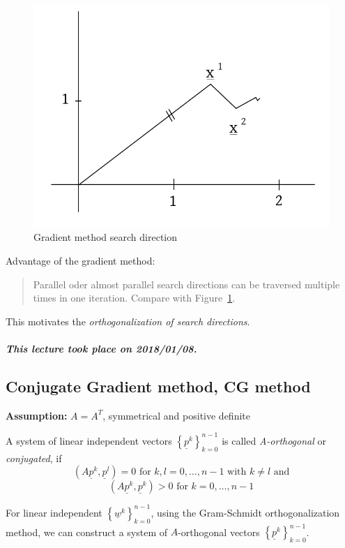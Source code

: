 \documentclass{article}
\newcommand{\dateref}[1]{\paragraph{\textit{This lecture took place on #1.}}}
\begin{document}
\begin{figure}[t]
  \begin{center}
    \includegraphics{img/gradient_method_search_direction.pdf}
    \caption{Gradient method search direction}
    \label{img:searchdir}
  \end{center}
\end{figure}
Advantage of the gradient method:
\begin{quote}
  Parallel oder almost parallel search directions can be traversed multiple times in one iteration.
  Compare with Figure~\ref{img:searchdir}.
\end{quote}
This motivates the \emph{orthogonalization of search directions}.

\dateref{2018/01/08}

\subsection[Conjugate gradient method]{Conjugate Gradient method, CG method}

\textbf{Assumption:} $A = A^T$, symmetrical and positive definite

A system of linear independent vectors $\left\{\underline{p}^k\right\}_{k=0}^{n-1}$ is called
\emph{A-orthogonal} or \emph{conjugated}, if
\[ (A\underline{p}^k, \underline{p}^l) = 0 \text{ for } k,l=0,\ldots,n-1 \text{ with } k\neq l \text{ and} \]
\[ (A \underline{p}^k, \underline{p}^k) > 0 \text{ for } k = 0,\ldots,n-1 \]

For linear independent $\left\{\underline{w}^k\right\}_{k=0}^{n-1}$, using the Gram-Schmidt orthogonalization method,
we can construct a system of $A$-orthogonal vectors $\left\{\underline{p}^k\right\}_{k=0}^{n-1}$.
\end{document}
